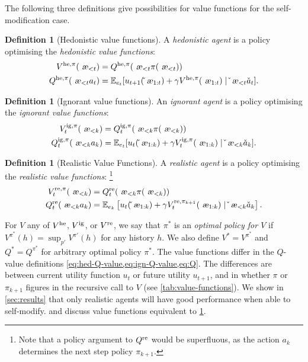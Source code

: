 \documentclass[a4paper]{article}
\theoremstyle{definition}
\newtheorem{definition}[theorem]{Definition}
\theoremstyle{remark}
\def\EE{{\mathbb{E}}}  %
\let\aechar\ae %
\renewcommand{\ae}{
\ifmmode\mathchoice{
	\mbox{\textsl{\aechar}}
}{
	\mbox{\textsl{\aechar}}
}{
	\mbox{\scriptsize\textsl{\aechar}}
}{
	\mbox{\scriptsize\textsl{\aechar}}
}\else\aechar\fi%
}                         %
\newcommand*{\Qhe}[1][]{Q^{{\rm he} #1}}
\newcommand*{\Vhe}[1][]{V^{{\rm he} #1}}
\newcommand*{\Qig}[1][]{Q^{{\rm ig} #1}}
\newcommand*{\Vig}[1][]{V^{{\rm ig} #1}}
\newcommand*{\Qre}[1][]{Q^{{\rm re} #1}}
\newcommand*{\Vre}[1][]{V^{{\rm re} #1}}
\renewcommand{\hat}{\check}
\begin{document}
The following three definitions give possibilities for value
functions for the self-modification case.

\begin{definition}[Hedonistic value functions]
  \label{def:hed-value}
  A \emph{hedonistic agent} is a policy optimising the
  \emph{hedonistic value functions}:
  \begin{align}
    \Vhe[,\pi](\ae_{<t})\label{eq:hed-V-value}
    &= \Qhe[,\pi](\ae_{<t}\pi(\ae_{<t}))\\
    \Qhe[,\pi](\ae_{<t}a_t) \label{eq:hed-Q-value}
    &= \EE_{e_t}[u_{t+1}(\hat\ae_{1:t}) + \gamma\Vhe[,\pi](\ae_{1:t})\mid \hat\ae_{<t}\hat a_t].
  \end{align}
\end{definition}

\begin{definition}[Ignorant value functions]\label{def:ign-value}
  An \emph{ignorant agent} is a policy optimising the
  \emph{ignorant value functions}:
  \begin{align}
    \Vig[,\pi]_t(\ae_{<k})\label{eq:ign-V-value}
    &= \Qig[,\pi]_t(\ae_{<k}\pi(\ae_{<k}))\\
    \Qig[,\pi]_t(\ae_{<k}a_k) \label{eq:ign-Q-value}
    &= \EE_{e_t}[u_t(\hat\ae_{1:k}) + \gamma\Vig[,\pi]_t(\ae_{1:k})\mid \hat\ae_{<k}\hat a_k].
  \end{align}
\end{definition}

\begin{definition}[Realistic Value Functions]
  \label{def:realistic-value}
  \label{def:re-value}
  A \emph{realistic agent} is a policy optimising the
  \emph{realistic value functions}:%
  \footnote{Note that a policy argument to $\Qre$ would be superfluous, as
    the action $a_k$ determines the next step policy $\pi_{k+1}$.}
  \begin{align}
    \Vre[,\pi]_t(\ae_{<k})
      &= \Qre_t(\ae_{<k}\pi(\ae_{<k}))\label{eq:V} \\
    \Qre_t (\ae_{<k}a_k)
      &= \EE_{e_k}\left[ u_t(\hat\ae_{1:k}) +
        \gamma \Vre[,\pi_{k+1}]_{t}(\ae_{1:k}) \mid \hat\ae_{<k}\hat a_k \right].\label{eq:Q}
  \end{align}
\end{definition}

For $V$ any of $\Vhe$, $\Vig$, or $\Vre$, we say that $\pi^*$ is an
\emph{optimal policy for $V$}
if $V^{\pi^*}(h)=\sup_{p'}V^{\pi'}(h)$ for any history $h$.
We also define $V^*=V^{\pi^*}$ and $Q^*=Q^{\pi^*}$ for arbitrary optimal policy $\pi^*$.
%
The value functions differ in the $Q$-value definitions
\cref{eq:hed-Q-value,eq:ign-Q-value,eq:Q}.
The differences are between current utility function $u_t$
or future utility $u_{t+1}$,
and in whether $\pi$ or $\pi_{k+1}$ figures in
the recursive call to $V$ (see \cref{tab:value-functions}).
We show in \cref{sec:results} that only realistic agents
will have good performance when able to self-modify.
\citet{Orseau2011} and \citet{Hibbard2012} discuss
value functions equivalent to \cref{def:realistic-value}.
\end{document}
